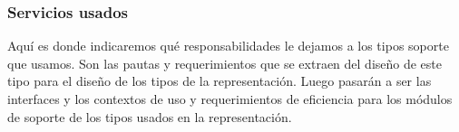 \subsubsection{Servicios usados}

Aqu\'i es donde indicaremos qu\'e responsabilidades le dejamos a los tipos soporte que usamos. Son las pautas y requerimientos que se extraen del dise\~no de este tipo para el dise\~no de los tipos de la representaci\'on. Luego pasar\'an a ser las interfaces y los contextos de uso y requerimientos de eficiencia para los m\'odulos de soporte de los tipos usados en la representaci\'on.
